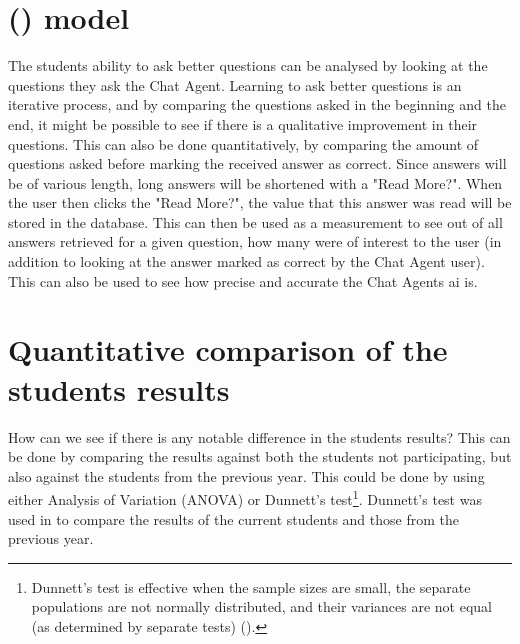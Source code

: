 \section{ () model}
\label{chapter4:qa_model}
The students ability to ask better questions can be analysed by looking at the questions they ask the Chat Agent. Learning to ask better questions is an iterative 
process, and by comparing the questions asked in the beginning and the end, it might be possible to see if there is a qualitative improvement in their questions.
This can also be done quantitatively, by comparing the amount of questions asked before marking the received answer as correct. 
\vspace{0.5em}\newline
Since answers will be of various length, long answers will be shortened with a "Read More?". When the user then clicks the "Read More?", the value that this answer 
was read will be stored in the database. This can then be used as a measurement to see out of all answers retrieved for a given question, how many were of interest 
to the user (in addition to looking at the answer marked as correct by the Chat Agent user). This can also be used to see how precise and accurate the Chat Agents 
\gls{ai} is.

\section{Quantitative comparison of the students results}
\label{chapter4:quantitative_comparison}
How can we see if there is any notable difference in the students results? This can be done by comparing the results against both the students not participating, but 
also against the students from the previous year. This could be done by using either Analysis of Variation (ANOVA) or Dunnett's test\footnote{	Dunnett's test is effective 
	when the sample sizes are small, the separate populations are not normally distributed, and their variances are not equal (as determined by separate tests) 
	(\citet[p.~3]{Simon2011}).}. Dunnett's test was used in \citet{Simon2011} to compare the results of the current students and those from the previous year.

